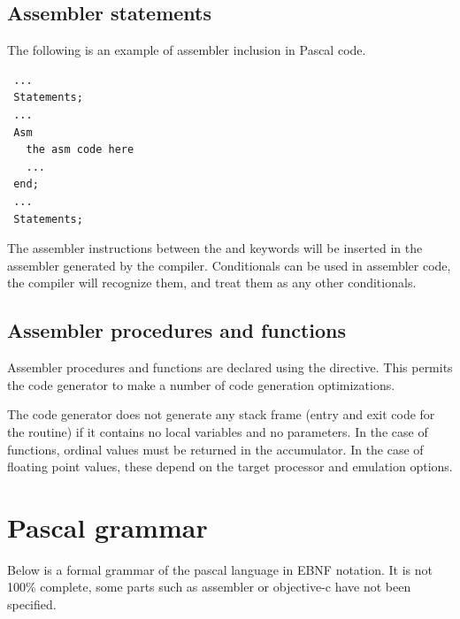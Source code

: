 \section{Assembler statements }
  
The following is an example of assembler inclusion in Pascal code.
\begin{verbatim}
 ...
 Statements;
 ...
 Asm
   the asm code here
   ...
 end;
 ...
 Statements;
\end{verbatim}
The assembler instructions between the  and  keywords will
be inserted in the assembler generated by the compiler.
Conditionals can be used in assembler code, the compiler will recognize them,
and treat them as any other conditionals.

\section{Assembler procedures and functions}
  
Assembler procedures and functions are declared using the
 directive.  This permits the code generator to make a number
of code generation optimizations.

The code generator does not generate any stack frame (entry and exit
code for the routine) if it contains no local variables and no
parameters. In the case of functions, ordinal values must be returned
in the accumulator. In the case of floating point values, these depend
on the target processor and emulation options.

\appendix

\chapter{Pascal grammar}

Below is a formal grammar of the pascal language in EBNF notation.
It is not 100\% complete, some parts such as assembler or objective-c have
not been specified.

\begin{grammar}
\renewcommand{\syntleft}{$\langle$\normalfont\itshape}
\renewcommand{\syntright}{$\rangle$}
\renewcommand{\litleft}{\"}
\renewcommand{\litright}{\"}
\renewcommand{\ulitleft}{\bfseries\"}
\renewcommand{\ulitright}{\"}

\end{grammar}
%
%
\printindex

